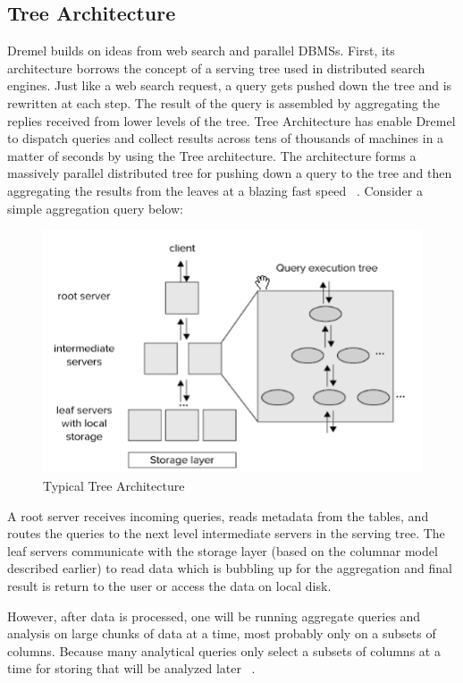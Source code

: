 \documentclass[9pt,twocolumn,twoside]{../../styles/osajnl}
\begin{document}
\subsection{Tree Architecture}
Dremel builds on ideas from web search and parallel DBMSs. First, its architecture borrows the concept of a serving tree used in distributed search engines. Just like a web search request, a query gets pushed down the tree and is rewritten at each step. The result of the query is assembled by aggregating the replies received from lower levels of the tree. Tree Architecture has enable Dremel to dispatch queries and collect results across tens of thousands of machines in a matter of seconds by using the Tree architecture. The architecture forms a massively parallel distributed tree for pushing down a query to the tree and then aggregating the results from the leaves at a blazing fast speed ~\cite{twitter-dremel}. Consider a simple aggregation query below:

\begin{figure}[H]
 \centering
\includegraphics[scale=0.7]{images/image4}
\caption{Typical Tree Architecture ~\cite{book-hadoop}} 
\end{figure}

A root server receives incoming queries, reads metadata from the tables, and routes the queries to the next level intermediate servers in the serving tree. The leaf servers communicate with the storage layer (based on the columnar model described earlier) to read data which is bubbling up for the aggregation and final result is return to the user  or access the data on local disk. 

However, after data is processed, one will be running aggregate queries and analysis on large chunks of data at a time, most probably only on a subsets of columns. Because many analytical queries only select a subsets of columns at a time for storing that will be analyzed later ~\cite{book-hadoop}.
\end{document}
